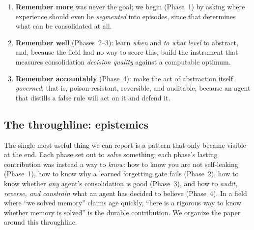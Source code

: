 \documentclass[11pt]{article}
\begin{document}
\begin{enumerate}
\item \textbf{Remember more} was never the goal; we begin (Phase~1) by asking where
experience should even be \emph{segmented} into episodes, since that determines what
can be consolidated at all.
\item \textbf{Remember well} (Phases~2--3): learn \emph{when} and \emph{to what level}
to abstract, and, because the field had no way to score this, build the instrument
that measures consolidation \emph{decision quality} against a computable optimum.
\item \textbf{Remember accountably} (Phase~4): make the act of abstraction itself
\emph{governed}, that is, poison-resistant, reversible, and auditable, because an agent
that distills a false rule will act on it and defend it.
\end{enumerate}

\subsection{The throughline: epistemics}

The single most useful thing we can report is a pattern that only became visible at
the end. Each phase set out to \emph{solve} something; each phase's lasting
contribution was instead a way to \emph{know}: how to know you are not
self-leaking (Phase~1), how to know why a learned forgetting gate fails (Phase~2),
how to know whether \emph{any} agent's consolidation is good (Phase~3), and how to
\emph{audit, reverse, and constrain} what an agent has decided to believe (Phase~4).
In a field where ``we solved memory'' claims age quickly, ``here is a rigorous way to
know whether memory is solved'' is the durable contribution. We organize the paper
around this throughline.
\end{document}
